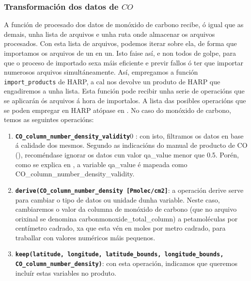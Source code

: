 \subsubsection{Transformación dos datos de $CO$}
A función de procesado dos datos de monóxido de carbono recibe, ó igual que as demais, unha lista de arquivos e unha ruta onde almacenar os arquivos procesados. Con esta lista de arquivos, podemos
iterar sobre ela, de forma que importamos os arquivos de un en un. Isto faise así, e non todos de golpe, para que o proceso de importado sexa máis eficiente e previr fallos ó ter que importar
numerosos arquivos simultáneamente. Así, empregamos a función \texttt{import\_products} de HARP, a cal nos devolve un produto de HARP que engadiremos a unha lista. Esta función pode recibir unha
serie de operacións que se aplicarán ós arquivos á hora de importalos. A lista das posibles operacións que se poden empregar en HARP atópase en \cite{HARPdoc}. No caso do monóxido de carbono, temos as
seguintes operacións:
\begin{enumerate}
    \item \texttt{\textbf{CO\_column\_number\_density\_validity}}0 : con isto, filtramos os datos en base á calidade dos mesmos. Segundo as indicacións do manual de producto de CO (\cite{COmanual}),
    recoméndase ignorar os datos cun valor qa\_value menor que 0.5. Porén, como se explica en \cite{HARPCO}, a variable qa\_value é mapeada como CO\_column\_number\_density\_validity.
    \item \texttt{\textbf{derive(CO\_column\_number\_density [Pmolec/cm2]}}: a operación derive serve para cambiar o tipo de datos ou unidade dunha variable. Neste caso, cambiaremos o valor da
    columna de monóxido de carbono (que no arquivo orixinal se denomina carbonmonoxide\_total\_column) a petamoléculas por centímetro cadrado, xa que esta vén en moles por metro cadrado, para
    traballar con valores numéricos máis pequenos.
    \item \texttt{\textbf{keep(latitude, longitude, latitude\_bounds, longitude\_bounds, \break CO\_column\_number\_density)}}: con esta operación, indicamos que queremos incluír estas variables no
    produto.
\end{enumerate}

